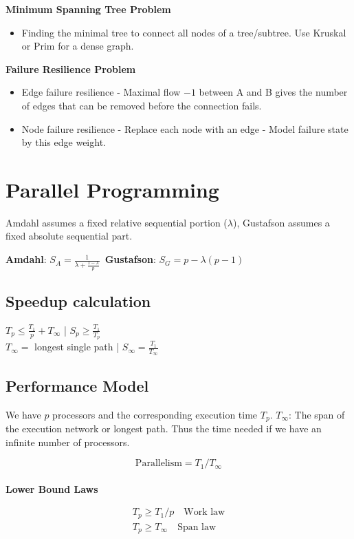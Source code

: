 \documentclass[10pt,landscape,a4paper, table]{extarticle}
\begin{document}
\begin{multicols*}{3}
\textbf{Minimum Spanning Tree Problem}

\begin{itemize}
    \item Finding the minimal tree to connect all nodes of a tree/subtree. Use Kruskal or Prim for a dense graph. 
\end{itemize}

\textbf{Failure Resilience Problem}

\begin{itemize}
    \item Edge failure resilience - Maximal flow $- 1$ between A and B gives the number of edges that can be removed before the connection fails. 
    \item Node failure resilience - Replace each node with an edge - Model failure state by this edge weight. 
\end{itemize}

\section{Parallel Programming}
Amdahl assumes a fixed relative sequential portion ($\lambda$), Gustafson assumes a fixed absolute sequential part.

\textbf{Amdahl}: $S_A = \frac{1}{\lambda + \frac{1-\lambda}{p}}$\ \textbf{Gustafson}: $S_G=p-\lambda(p-1)$
\subsection{Speedup calculation}
$T_p \leq \frac{T_1}{p} + T_\infty$ |  $S_p \geq \frac{T_1}{T_p}$\\
$T_{\infty} = $ longest single path | $S_{\infty} = \frac{T_1}{T_{\infty}}$

\subsection{Performance Model}

We have $p$ processors and the corresponding execution time $T_p$.
$T_{\infty}$: The span of the execution network or longest path. Thus the time needed if we have an infinite number of processors. 

$$\text{Parallelism} = T_1/T_\infty$$\\

\textbf{Lower Bound Laws}

\begin{align*}
    T_p \geq T_1/p\quad \text{Work law}\\
    T_p \geq T_\infty\quad \text{Span law}\\
\end{align*}


\end{multicols*}
\end{document}
